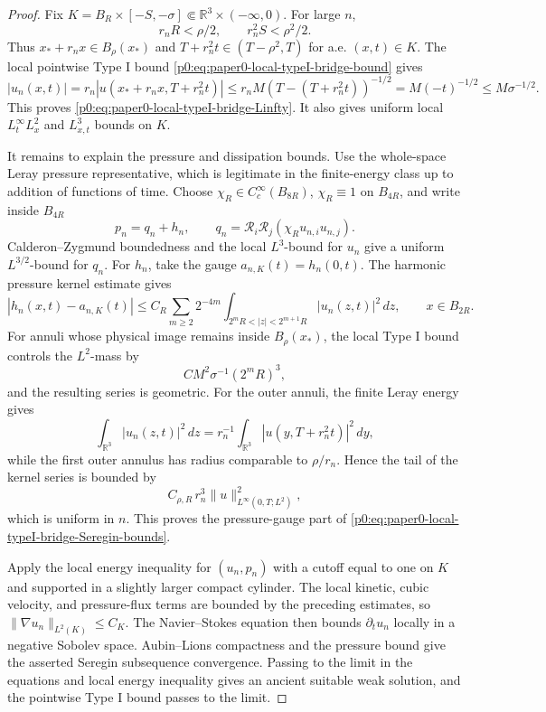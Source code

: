 \documentclass[11pt]{amsart}
\theoremstyle{plain}
\theoremstyle{definition}
\theoremstyle{remark}
\numberwithin{equation}{section}
\begin{document}
\begin{proof}
Fix \(K=B_R\times[-S,-\sigma]\Subset\mathbb R^3\times(-\infty,0)\).  For
large \(n\),
\[
  r_nR<\rho/2,\qquad r_n^2S<\rho^2/2.
\]
Thus \(x_*+r_nx\in B_\rho(x_*)\) and
\(T+r_n^2t\in(T-\rho^2,T)\) for a.e. \((x,t)\in K\).  The local pointwise Type I bound
\eqref{p0:eq:paper0-local-typeI-bridge-bound} gives
\[
  |u_n(x,t)|
  =r_n|u(x_*+r_nx,T+r_n^2t)|
  \le r_nM(T-(T+r_n^2t))^{-1/2}
  =M(-t)^{-1/2}
  \le M\sigma^{-1/2}.
\]
This proves \eqref{p0:eq:paper0-local-typeI-bridge-Linfty}.  It also gives
uniform local \(L^\infty_tL^2_x\) and \(L^3_{x,t}\) bounds on \(K\).

It remains to explain the pressure and dissipation bounds.  Use the
whole-space Leray pressure representative, which is legitimate in the
finite-energy class up to addition of functions of time.  Choose
\(\chi_R\in C_c^\infty(B_{8R})\), \(\chi_R\equiv1\) on \(B_{4R}\), and write
inside \(B_{4R}\)
\[
  p_n=q_n+h_n,\qquad
  q_n=\mathcal R_i\mathcal R_j(\chi_Ru_{n,i}u_{n,j}).
\]
Calderon--Zygmund boundedness and the local \(L^3\)-bound for \(u_n\) give a
uniform \(L^{3/2}\)-bound for \(q_n\).  For \(h_n\), take the gauge
\(a_{n,K}(t)=h_n(0,t)\).  The harmonic pressure kernel estimate gives
\[
  |h_n(x,t)-a_{n,K}(t)|
  \le
  C_R\sum_{m\ge2}2^{-4m}
  \int_{2^mR<|z|<2^{m+1}R}|u_n(z,t)|^2\,dz,
  \qquad x\in B_{2R}.
\]
For annuli whose physical image remains inside \(B_\rho(x_*)\), the local
Type I bound controls the \(L^2\)-mass by
\[
  C M^2\sigma^{-1}(2^mR)^3,
\]
and the resulting series is geometric.  For the outer annuli, the finite
Leray energy gives
\[
  \int_{\mathbb R^3}|u_n(z,t)|^2\,dz
  =r_n^{-1}\int_{\mathbb R^3}|u(y,T+r_n^2t)|^2\,dy,
\]
while the first outer annulus has radius comparable to \(\rho/r_n\).  Hence
the tail of the kernel series is bounded by
\[
  C_{\rho,R}\,r_n^3\|u\|_{L^\infty(0,T;L^2)}^2,
\]
which is uniform in \(n\).  This proves the pressure-gauge part of
\eqref{p0:eq:paper0-local-typeI-bridge-Seregin-bounds}.

Apply the local energy inequality for \((u_n,p_n)\) with a cutoff equal to one
on \(K\) and supported in a slightly larger compact cylinder.  The local
kinetic, cubic velocity, and pressure-flux terms are bounded by the preceding
estimates, so \(\|\nabla u_n\|_{L^2(K)}\le C_K\).  The Navier--Stokes
equation then bounds \(\partial_tu_n\) locally in a negative Sobolev space.
Aubin--Lions compactness and the pressure bound give the asserted Seregin
subsequence convergence.  Passing to the limit in the equations and local
energy inequality gives an ancient suitable weak solution, and the pointwise
Type I bound passes to the limit.
\end{proof}
\end{document}
